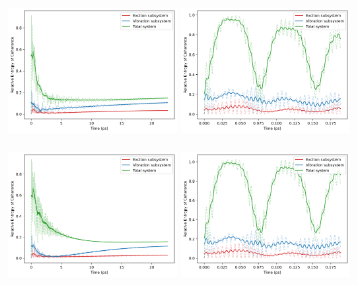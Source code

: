 \documentclass[11pt]{article}
\begin{document}
\begin{figure}[H]
    \centering

    \begin{subfigure}{\textwidth}
        \centering
        \includegraphics[width=0.49\textwidth]{Research Project/Code/results/ExVib/Open/Coherence/Envelope/coh_spont_e0.png}
        \hfill
        \includegraphics[width=0.49\textwidth]{Research Project/Code/results/ExVib/Open/Coherence/Fast/coh_spont_e0.png}
        \caption{}
        \label{fig:EVM_OQS_Coh_spont_e0}
    \end{subfigure}

    \vspace{0.8em}

    \begin{subfigure}{\textwidth}
        \centering
        \includegraphics[width=0.49\textwidth]{Research Project/Code/results/ExVib/Open/Coherence/Envelope/coh_therm_e0.png}
        \hfill
        \includegraphics[width=0.49\textwidth]{Research Project/Code/results/ExVib/Open/Coherence/Fast/coh_therm_e0.png}
        \caption{}
        \label{fig:EVM_OQS_Coh_therm_e0}
    \end{subfigure}


\end{figure}
\end{document}
